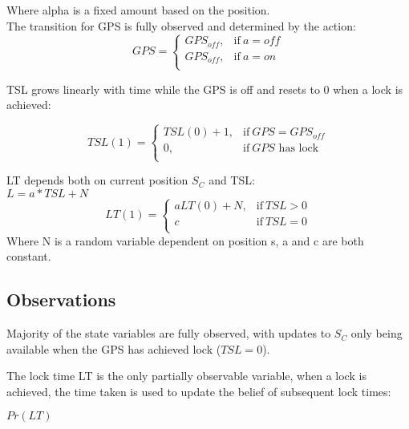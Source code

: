 \documentclass[12pt,openany,a4paper]{book}
\begin{document}
Where alpha is a fixed amount based on the position.\\

\noindent The transition for GPS is fully observed and  determined by the action:\\
  \begin{equation}
   {GPS} = 
  \begin{cases}
   GPS_{off}, & \text{if}\ a={off} \\
   GPS_{off}, & \text{if}\ a={on} \\
  \end{cases}
\end{equation}

\noindent TSL grows linearly with time while the GPS is off and resets to 0 when a lock is achieved:

  \begin{equation}
   TSL(1) = 
  \begin{cases}
   TSL(0) + 1, & \text{if}\ GPS={GPS_{off}} \\
   0, & \text{if}\ GPS \text{ has lock} \\
  \end{cases}
\end{equation}

\noindent LT depends both on current position \ensuremath{S_C} and TSL:\\
\ensuremath{L = a * TSL + N}\\
  \begin{equation}
   LT(1) = 
  \begin{cases}
   aLT(0) + N, & \text{if}\ TSL > 0 \\
   c & \text{if}\  TSL = 0 \\
  \end{cases}
\end{equation}
Where N is a random variable dependent on position s, a and c are both constant.

\subsection*{Observations}
Majority of the state variables are fully observed, with updates to \ensuremath{S_{C}} only being available when the GPS has achieved lock (\ensuremath{TSL = 0}).

\noindent The lock time LT is the only partially observable variable, when a lock is achieved, the time taken is used to update the belief of subsequent lock times:

\ensuremath{ Pr(LT)}
\end{document}
